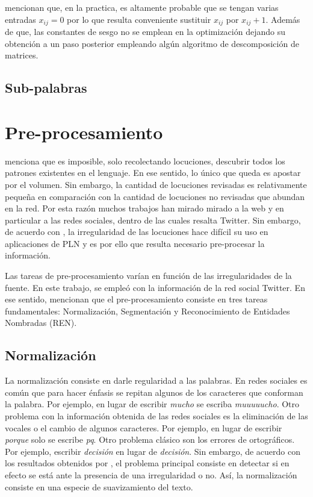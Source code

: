 \cite{shi2014linking} mencionan que, en la practica, es altamente probable que se tengan varias entradas $x_{ij}=0$ por lo que resulta conveniente sustituir $x_{ij}$ por $x_{ij} +1$. Además de que, las constantes de sesgo no se emplean en la optimización dejando su obtención a un paso posterior empleando algún algoritmo de descomposición de matrices.

\subsection{Sub-palabras}



\section{Pre-procesamiento}
\label{sec:sec23}

\cite{chomsky2004estructuras} menciona que es imposible, solo recolectando locuciones, descubrir todos los patrones existentes en el lenguaje. En ese sentido, lo único que queda es apostar por el volumen. Sin embargo, la cantidad de locuciones revisadas es relativamente pequeña en comparación con la cantidad de locuciones no revisadas que abundan en la red. Por esta razón muchos trabajos han mirado mirado a la web y en particular a las redes sociales, dentro de las cuales resalta Twitter. Sin embargo, de acuerdo con \cite{clark2011text}, la irregularidad de las locuciones hace difícil su uso en aplicaciones de PLN y es por ello que resulta necesario pre-procesar la información.

Las tareas de pre-procesamiento varían en función de las irregularidades de la fuente. En este trabajo, se empleó con la información de la red social Twitter. En ese sentido, \cite{billal2016efficient} mencionan que el pre-procesamiento consiste en tres tareas fundamentales: Normalización, Segmentación y Reconocimiento de Entidades Nombradas (REN).

\subsection{Normalización}
La normalización consiste en darle regularidad a las palabras. En redes sociales es común que para hacer énfasis se repitan algunos de los caracteres que conforman la palabra. Por ejemplo, en lugar de escribir \textit{mucho} se escriba \textit{muuuuucho}. Otro problema con la información obtenida de las redes sociales es la eliminación de las vocales o el cambio de algunos caracteres. Por ejemplo, en lugar de escribir \textit{porque} solo se escribe \textit{pq}. Otro problema clásico son los errores de ortográficos. Por ejemplo, escribir \textit{decisión} en lugar de \textit{decisión}. Sin embargo, de acuerdo con los resultados obtenidos por \cite{hassan2013social}, el problema principal consiste en detectar si en efecto se está ante la presencia de una irregularidad o no. Así, la normalización consiste en una especie de suavizamiento del texto. 

